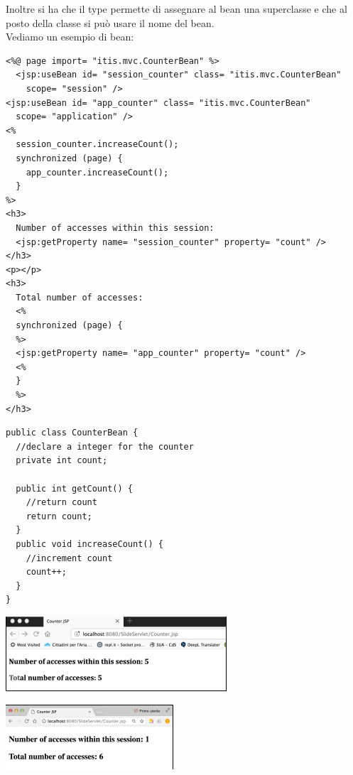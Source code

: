 \documentclass[a4paper,12pt, oneside]{book}
\begin{document}
Inoltre si ha che il type permette di assegnare al bean una superclasse e che al posto della classe si può usare il nome del bean.\\
Vediamo un esempio di bean:
\begin{verbatim}
<%@ page import= "itis.mvc.CounterBean" %>
  <jsp:useBean id= "session_counter" class= "itis.mvc.CounterBean"
    scope= "session" />
<jsp:useBean id= "app_counter" class= "itis.mvc.CounterBean"
  scope= "application" />
<%
  session_counter.increaseCount();
  synchronized (page) {
    app_counter.increaseCount();
  }
%>
<h3>
  Number of accesses within this session:
  <jsp:getProperty name= "session_counter" property= "count" />
</h3>
<p></p>
<h3>
  Total number of accesses:
  <%
  synchronized (page) {
  %>
  <jsp:getProperty name= "app_counter" property= "count" />
  <%
  }
  %>
</h3>
\end{verbatim} 
\begin{verbatim}
public class CounterBean {
  //declare a integer for the counter
  private int count;
  
  public int getCount() {
    //return count
    return count;
  }
  public void increaseCount() {
    //increment count
    count++;
  }
}
\end{verbatim}
\begin{center}
	\includegraphics[scale=0.7]{img/count1.png}
\end{center}
\begin{center}
	\includegraphics[scale=0.8]{img/count2.png}
\end{center}
\end{document}
